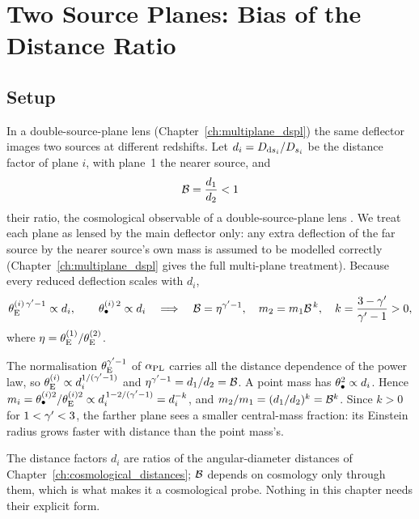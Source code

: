 \section{Two Source Planes: Bias of the Distance Ratio}
\label{sec:pe_dspl}

\subsection{Setup}

In a double-source-plane lens (Chapter~\ref{ch:multiplane_dspl}) the
same deflector images two sources at different redshifts. Let
$d_i=D_{{\rm d}s_i}/D_{s_i}$ be the distance factor of plane $i$, with
plane~1 the nearer source, and
\begin{equation}
    \mathcal{B}=\frac{d_1}{d_2}<1
    \label{eq:pe_B}
\end{equation}
their ratio, the cosmological observable of a double-source-plane
lens \citep{collett_2012}. We treat each plane as lensed by the main
deflector only: any extra deflection of the far source by the nearer
source's own mass is assumed to be modelled correctly
(Chapter~\ref{ch:multiplane_dspl} gives the full multi-plane
treatment). Because every reduced deflection scales with $d_i$,
\begin{equation}
    \theta_{\mathrm{E}}^{(i)\,\gamma'-1}\propto d_i,\qquad
    \theta_{\bullet}^{(i)\,2}\propto d_i
    \quad\Longrightarrow\quad
    \mathcal{B}=\eta^{\gamma'-1},\quad
    m_2=m_1\mathcal{B}^{\,k},\quad
    k=\frac{3-\gamma'}{\gamma'-1}>0 ,
    \label{eq:pe_mscaling}
\end{equation}
where $\eta=\theta_{\mathrm{E}}^{(1)}/\theta_{\mathrm{E}}^{(2)}$.

\begin{derivation}
The normalisation $\theta_{\mathrm{E}}^{\gamma'-1}$ of $\alpha_{\rm PL}$ carries all the
distance dependence of the power law, so
$\theta_{\mathrm{E}}^{(i)}\propto d_i^{1/(\gamma'-1)}$ and
$\eta^{\gamma'-1}=d_1/d_2=\mathcal{B}$. A point mass has $\theta_{\bullet}^2\propto d_i$.
Hence
$m_i=\theta_{\bullet}^{(i)2}/\theta_{\mathrm{E}}^{(i)2}\propto d_i^{\,1-2/(\gamma'-1)}=d_i^{-k}$,
and $m_2/m_1=(d_1/d_2)^{k}=\mathcal{B}^{k}$. Since $k>0$ for $1<\gamma'<3$,
the farther plane sees a smaller central-mass fraction: its
Einstein radius grows faster with distance than the point mass's.
\end{derivation}

\begin{bridge}[Distances]
The distance factors $d_i$ are ratios of the angular-diameter distances
of Chapter~\ref{ch:cosmological_distances}; $\mathcal{B}$ depends on cosmology
only through them, which is what makes it a cosmological probe. Nothing
in this chapter needs their explicit form.
\end{bridge}

